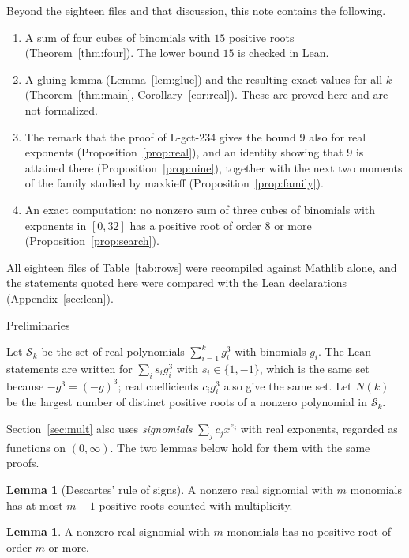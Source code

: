 \documentclass[10pt,a4paper]{article}
\makeatletter
\renewcommand\section{\@startsection{section}{1}{\z@}{1.7em plus .3em minus .2em}{0.25em}%
  {\normalfont\bfseries\fontsize{13.5}{17}\selectfont\raggedright}}
\theoremstyle{definition}
\newtheorem{lemma}[theorem]{Lemma}
\newcommand{\row}[1]{L-gct-#1}
\makeatother
\begin{document}
Beyond the eighteen files and that discussion, this note contains the following.
\begin{enumerate}\setlength{\itemsep}{0pt}
\item[(a)] A sum of four cubes of binomials with $15$ positive roots (Theorem~\ref{thm:four}). The lower bound $15$ is
checked in Lean.
\item[(b)] A gluing lemma (Lemma~\ref{lem:glue}) and the resulting exact values for all $k$
(Theorem~\ref{thm:main}, Corollary~\ref{cor:real}). These are proved here and are not formalized.
\item[(c)] The remark that the proof of \row{234} gives the bound $9$ also for real exponents
(Proposition~\ref{prop:real}), and an identity showing that $9$ is attained there (Proposition~\ref{prop:nine}),
together with the next two moments of the family studied by maxkieff (Proposition~\ref{prop:family}).
\item[(d)] An exact computation: no nonzero sum of three cubes of binomials with exponents in $[0,32]$ has a
positive root of order $8$ or more (Proposition~\ref{prop:search}).
\end{enumerate}
All eighteen files of Table~\ref{tab:rows} were recompiled against Mathlib alone, and the statements quoted here were
compared with the Lean declarations (Appendix~\ref{sec:lean}).

\section{Preliminaries}\label{sec:prelim}

Let $\mathcal{S}_k$ be the set of real polynomials $\sum_{i=1}^k g_i^3$ with binomials $g_i$. The Lean statements
are written for $\sum_i s_i g_i^3$ with $s_i\in\{1,-1\}$, which is the same set because $-g^3=(-g)^3$; real
coefficients $c_ig_i^3$ also give the same set. Let $N(k)$ be the largest number of distinct positive roots of a
nonzero polynomial in $\mathcal{S}_k$.

Section~\ref{sec:mult} also uses \emph{signomials} $\sum_j c_jx^{e_j}$ with real exponents, regarded as functions on
$(0,\infty)$. The two lemmas below hold for them with the same proofs.

\begin{lemma}[Descartes' rule of signs]\label{lem:descartes}
A nonzero real signomial with $m$ monomials has at most $m-1$ positive roots counted with multiplicity.
\end{lemma}

\begin{lemma}\label{lem:hajos}
A nonzero real signomial with $m$ monomials has no positive root of order $m$ or more.
\end{lemma}
\end{document}
